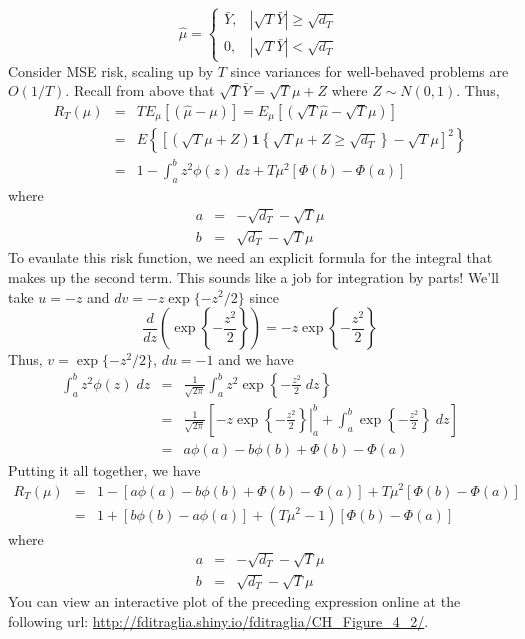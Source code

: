 	$$\widehat{\mu}=\left\{\begin{array}
		{cc} \bar{Y}, & |\sqrt{T}\bar{Y} | \geq \sqrt{d_T} \\
		0, & |\sqrt{T}\bar{Y} | < \sqrt{d_T}
		\end{array}\right.$$
Consider MSE risk, scaling up by $T$ since variances for well-behaved problems are $O(1/T)$. Recall from above that $\sqrt{T} \bar{Y} = \sqrt{T}\mu +Z$ where $Z\sim N(0,1)$. Thus,
\begin{eqnarray*}
	R_T(\mu) &=& T E_\mu\left[\left( \widehat{\mu} - \mu\right)\right] = E_\mu\left[\left(\sqrt{T} \widehat{\mu} - \sqrt{T} \mu\right)\right]\\
		&=& E\left\{\left[ \left(\sqrt{T}\mu + Z \right)\mathbf{1}\left\{\sqrt{T}\mu + Z \geq \sqrt{d_T}\right\}- \sqrt{T}\mu \right]^2 \right\}\\
		&=& 1 - \int_{a}^{b} z^2 \phi(z)\; dz + T\mu^2 \left[\Phi(b) - \Phi(a) \right]
\end{eqnarray*}
where
	\begin{eqnarray*}
		a &=& -\sqrt{d_T} - \sqrt{T}\mu\\
		b &=& \sqrt{d_T} - \sqrt{T}\mu
	\end{eqnarray*}
To evaulate this risk function, we need an explicit formula for the integral that makes up the second term. This sounds like a job for integration by parts! We'll take $u = -z$ and $dv = -z \exp\{-z^2/2\}$ since
	$$\frac{d}{dz} \left(\exp\left\{-\frac{z^2}{2}\right\}\right) = -z\exp\left\{-\frac{z^2}{2}\right\}$$
Thus, $v = \exp\{-z^2/2\}$, $du = -1$ and we have
\begin{eqnarray*}
	\int_a^b z^2 \phi(z) \; dz &=&\frac{1}{\sqrt{2\pi}} \int_a^b z^2 \exp\left\{-\frac{z^2}{2} \; dz\right\} \\
		&=& \frac{1}{\sqrt{2\pi}}\left[-z \exp\left\{ \left.-\frac{z^2}{2}\right\}\right|_a^b+ \int_a^b \exp\left\{-\frac{z^2}{2}\right\}  \; dz \right]\\
		&=& a\phi(a) - b\phi(b) + \Phi(b) - \Phi(a)
\end{eqnarray*}
Putting it all together, we have
	\begin{eqnarray*}
		R_T(\mu) &=& 1 - \left[a\phi(a) - b\phi(b) + \Phi(b) - \Phi(a) \right] + T\mu^2 \left[\Phi(b) - \Phi(a) \right]\\
		&=&1 + \left[b\phi(b) - a\phi(a)\right]  + (T\mu^2 - 1) \left[\Phi(b) - \Phi(a) \right] 
	\end{eqnarray*}
where
	\begin{eqnarray*}
		a &=& -\sqrt{d_T} - \sqrt{T}\mu\\
		b &=& \sqrt{d_T} - \sqrt{T}\mu
	\end{eqnarray*}
You can view an interactive plot of the preceding expression online at the following url:
\url{http://fditraglia.shiny.io/fditraglia/CH_Figure_4_2/}.

